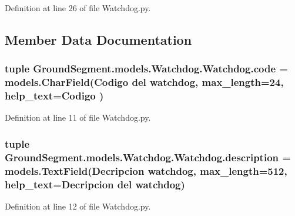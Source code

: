 Definition at line 26 of file Watchdog.\+py.



\subsection{Member Data Documentation}
\hypertarget{class_ground_segment_1_1models_1_1_watchdog_1_1_watchdog_a9548413d6e37739ac54bdaa3a75d66f4}{}
\subsubsection[{code}]{\setlength{\rightskip}{0pt plus 5cm}tuple Ground\+Segment.\+models.\+Watchdog.\+Watchdog.\+code = models.\+Char\+Field(\textquotesingle{}Codigo del watchdog\textquotesingle{}, max\+\_\+length=24, help\+\_\+text=\textquotesingle{}Codigo\textquotesingle{} )\hspace{0.3cm}{\ttfamily [static]}}\label{class_ground_segment_1_1models_1_1_watchdog_1_1_watchdog_a9548413d6e37739ac54bdaa3a75d66f4}


Definition at line 11 of file Watchdog.\+py.

\hypertarget{class_ground_segment_1_1models_1_1_watchdog_1_1_watchdog_ab6bf4dee4015f39a9c62850ee3ca830e}{}
\subsubsection[{description}]{\setlength{\rightskip}{0pt plus 5cm}tuple Ground\+Segment.\+models.\+Watchdog.\+Watchdog.\+description = models.\+Text\+Field(\textquotesingle{}Decripcion watchdog\textquotesingle{}, max\+\_\+length=512, help\+\_\+text=\textquotesingle{}Decripcion del watchdog\textquotesingle{})\hspace{0.3cm}{\ttfamily [static]}}\label{class_ground_segment_1_1models_1_1_watchdog_1_1_watchdog_ab6bf4dee4015f39a9c62850ee3ca830e}


Definition at line 12 of file Watchdog.\+py.

\hypertarget{class_ground_segment_1_1models_1_1_watchdog_1_1_watchdog_ac6ffa32a8b52ba04c20b99b0e4567bd5}{}
